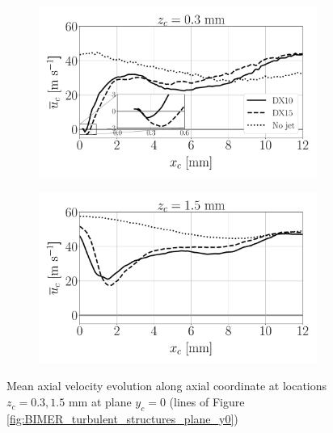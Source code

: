 \clearpage


\begin{figure}[ht]
\flushleft
\begin{subfigure}[b]{0.45\textwidth}
	\flushleft
   \includegraphics[scale=0.25]{./part3_applications/figures_ch8_resolved/turbulent_structures/line_y0_along_x_zlow}
\end{subfigure}
\hspace{0.4in}
\begin{subfigure}[b]{0.45\textwidth}
	\flushleft
   \includegraphics[scale=0.25]{./part3_applications/figures_ch8_resolved/turbulent_structures/line_y0_along_x_zhigh}
\end{subfigure}
\caption{Mean axial velocity evolution along axial coordinate at locations $z_c = 0.3, 1.5$ mm at plane $y_c = 0$ (lines of Figure \ref{fig:BIMER_turbulent_structures_plane_y0})}
\label{fig:BIMER_sps_lines_y0_along_x_ux_mean}
\end{figure}


